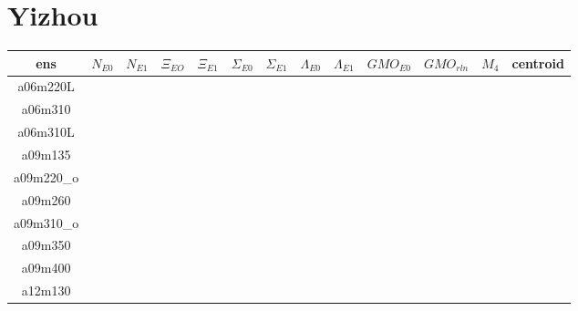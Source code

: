 \documentclass{article}
\begin{document}
\section*{Yizhou}
\begin{table}[h!]
  \centering
 \setlength{\arrayrulewidth}{0.5mm}
\setlength{\tabcolsep}{13pt}
\renewcommand{\arraystretch}{2}
 \begin{tabular}{|| c |c | c | c | c | c | c | c | c | c | c | c | c ||} 
 \hline
 ens & $N_{E0}$ & $N_{E1}$ & $\Xi_{EO}$ &  $\Xi_{E1}$ & $\Sigma_{E0}$ & $\Sigma_{E1}$ & $\Lambda_{E0}$ & $\Lambda_{E1}$ & $GMO_{E0}$ &  $GMO_{rln}$ & $M_4$ & centroid \\ [0.8ex] 
 \hline\hline
 a06m220L 
 & {}   &   {} & {}   & {}   & {}  & {}   & {}  & {}  & {}  & {}  &  \\ 
 \hline
 a06m310 
 & {}   &   {} & {}   & {}   & {}  & {}   & {}  & {}  & {}  & {}  &  \\
 \hline
 a06m310L 
  & {}   &   {} & {}   & {}   & {}  & {}   & {}  & {}  & {}  & {}  &  \\
 \hline
 a09m135 
  & {}   &   {} & {}   & {}   & {}  & {}   & {}  & {}  & {}  & {}  &  \\
 \hline
 a09m220_o 
 & {}   &   {} & {}   & {}   & {}  & {}   & {}  & {}  & {}  & {}  &  \\
 \hline
 a09m260
  & {}   &   {} & {}   & {}   & {}  & {}   & {}  & {}  & {}  & {}  &  \\
 \hline
 a09m310_o
  & {}   &   {} & {}   & {}   & {}  & {}   & {}  & {}  & {}  & {}  &  \\
 \hline
 a09m350 
  & {}   &   {} & {}   & {}   & {}  & {}   & {}  & {}  & {}  & {}  &  \\
 \hline
 a09m400 
  & {}   &   {} & {}   & {}   & {}  & {}   & {}  & {}  & {}  & {}  &  \\
 \hline
 a12m130 
  & {}   &   {} & {}   & {}   & {}  & {}   & {}  & {}  & {}  & {}  &  \\
 \hline
 
 \end{tabular}
\end{table}
 \newpage
\end{document}

